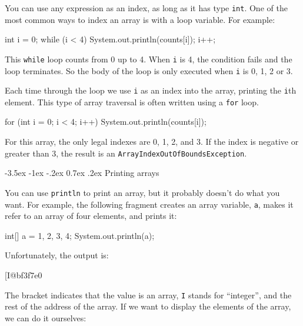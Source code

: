 \documentclass[12pt]{book}
\makeatletter
\theoremstyle{exercise}
\newcommand{\java}[1]{\verb"#1"}
\renewcommand{\section}{\@startsection{section}{1}{\z@}%
    {-3.5ex \@plus -1ex \@minus -.2ex}%
    {0.7ex \@plus.2ex}%
    {\normalfont\Large\bfseries}}
\newcommand{\java}[1]{\lstinline{#1}} %
\makeatother
\begin{document}

You can use any expression as an index, as long as it has type \java{int}.
One of the most common ways to index an array is with a loop variable.
For example:

\begin{code}
    int i = 0;
    while (i < 4) {
        System.out.println(counts[i]);
        i++;
    }
\end{code}


This \java{while} loop counts from 0 up to 4.
When \java{i} is 4, the condition fails and the loop terminates.
So the body of the loop is only executed when \java{i} is 0, 1, 2 or 3.

Each time through the loop we use \java{i} as an index into the array, printing the \java{i}th element.
This type of array traversal is often written using a \java{for} loop.

\begin{code}
    for (int i = 0; i < 4; i++) {
        System.out.println(counts[i]);
    }
\end{code}

For this array, the only legal indexes are 0, 1, 2, and 3.
If the index is negative or greater than 3, the result is an \java{ArrayIndexOutOfBoundsException}.



\section{Printing arrays}
\label{printarray}

You can use \java{println} to print an array, but it probably doesn't do what you want.
For example, the following fragment creates an array variable, \java{a}, makes it refer to an array of four elements, and prints it:

\begin{code}
    int[] a = {1, 2, 3, 4};
    System.out.println(a);
\end{code}

Unfortunately, the output is:

\begin{stdout}
[I@bf3f7e0
\end{stdout}

The bracket indicates that the value is an array, \java{I} stands for ``integer'', and the rest of the address of the array.
If we want to display the elements of the array, we can do it ourselves:
\end{document}

